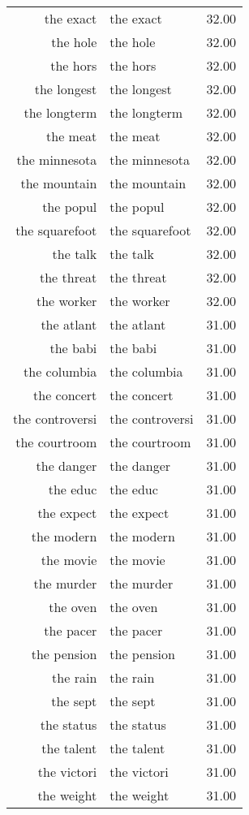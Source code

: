 \begin{table}[ht]
\begin{tabular}{rlr}
  the exact & the exact & 32.00 \\ 
  the hole & the hole & 32.00 \\ 
  the hors & the hors & 32.00 \\ 
  the longest & the longest & 32.00 \\ 
  the longterm & the longterm & 32.00 \\ 
  the meat & the meat & 32.00 \\ 
  the minnesota & the minnesota & 32.00 \\ 
  the mountain & the mountain & 32.00 \\ 
  the popul & the popul & 32.00 \\ 
  the squarefoot & the squarefoot & 32.00 \\ 
  the talk & the talk & 32.00 \\ 
  the threat & the threat & 32.00 \\ 
  the worker & the worker & 32.00 \\ 
  the atlant & the atlant & 31.00 \\ 
  the babi & the babi & 31.00 \\ 
  the columbia & the columbia & 31.00 \\ 
  the concert & the concert & 31.00 \\ 
  the controversi & the controversi & 31.00 \\ 
  the courtroom & the courtroom & 31.00 \\ 
  the danger & the danger & 31.00 \\ 
  the educ & the educ & 31.00 \\ 
  the expect & the expect & 31.00 \\ 
  the modern & the modern & 31.00 \\ 
  the movie & the movie & 31.00 \\ 
  the murder & the murder & 31.00 \\ 
  the oven & the oven & 31.00 \\ 
  the pacer & the pacer & 31.00 \\ 
  the pension & the pension & 31.00 \\ 
  the rain & the rain & 31.00 \\ 
  the sept & the sept & 31.00 \\ 
  the status & the status & 31.00 \\ 
  the talent & the talent & 31.00 \\ 
  the victori & the victori & 31.00 \\ 
  the weight & the weight & 31.00 \\ 

\end{tabular}
\end{table}
